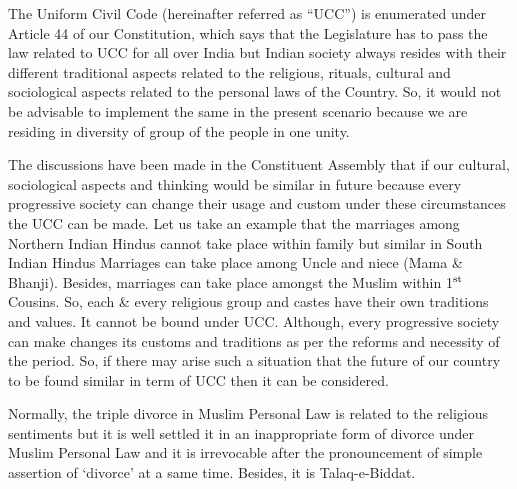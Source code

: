 \setcounter{figure}{0}
\setcounter{table}{0}
\setcounter{footnote}{0}

\label{2021-art2}
\vspace{-.3cm}



\begin{multicols}{2}


\vspace{-.15cm}

\noi
The Uniform Civil Code (hereinafter referred as “UCC”) is enumerated under Article 44 of
our Constitution, which says that the Legislature has to pass the law related to UCC for all
over India but Indian society always resides with their different traditional aspects related to
the religious, rituals, cultural and sociological aspects related to the personal laws of the
Country. So, it would not be advisable to implement the same in the present scenario because
we are residing in diversity of group of the people in one unity.

\vspace{-.15cm}

\noi
The discussions have been made in the Constituent Assembly that if our cultural, sociological
aspects and thinking would be similar in future because every progressive society can change
their usage and custom under these circumstances the UCC can be made. Let us take an
example that the marriages among Northern Indian Hindus cannot take place within family
but similar in South Indian Hindus Marriages can take place among Uncle and niece (Mama
\& Bhanji). Besides, marriages can take place amongst the Muslim within 1$^{\rm st}$ Cousins. So,
each \& every religious group and castes have their own traditions and values. It cannot be
bound under UCC. Although, every progressive society can make changes its customs and
traditions as per the reforms and necessity of the period. So, if there may arise such a
situation that the future of our country to be found similar in term of UCC then it can be
considered.

\vspace{-.15cm}

\noi
Normally, the triple divorce in Muslim Personal Law is related to the religious sentiments but
it is well settled it in an inappropriate form of divorce under Muslim Personal Law and it is
irrevocable after the pronouncement of simple assertion of ‘divorce’ at a same time. Besides,
it is Talaq-e-Biddat.


\end{multicols}
